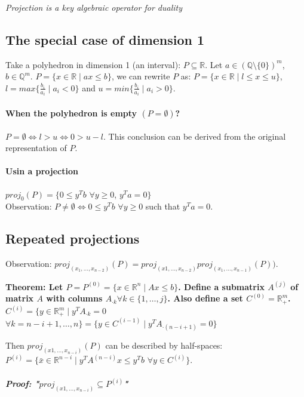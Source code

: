 \documentclass[main]{subfiles}
\begin{document}
\emph{Projection is a key algebraic operator for duality}

\subsection{The special case of dimension 1}
Take a polyhedron in dimension 1 (an interval): $P \subseteq \mathbb{R}$.
Let $a \in (\mathbb{Q}\setminus \{0\})^m$, $b \in \mathbb{Q}^m$. $P = \{ x \in
\mathbb{R} \mid ax \leq b \}$, we can rewrite $P$ as: $P = \{ x \in \mathbb{R}
\mid l \leq x \leq u \}$, $l = max \{ \frac{b_i}{a_i} \mid a_i < 0 \}$ and $u =
min \{ \frac{b_i}{a_i} \mid a_i > 0 \}$.

\paragraph{When the polyhedron is empty $(P = \emptyset)$?}
$P = \emptyset \iff l > u \iff 0 > u-l$. This conclusion can be derived from
the original representation of $P$.

\paragraph{Usin a projection}
$proj_{0}(P) = \{ 0 \leq y^T b$ $\forall y \geq 0$, $y^T a = 0 \}$ \\
Observation: $P \neq \emptyset \iff 0 \leq y^T b$ $\forall y \geq 0$ such that
$y^T a = 0$.

\subsection{Repeated projections}
Observation: $proj_{(x_1, \dots, x_{n-2})}(P) = proj_{(x1, \dots, x_{n-2})}
proj_{(x_1, \dots, x_{n-1})}(P))$.

\textbf{Theorem: Let $P = P^{(0)} = \{ x \in \mathbb{R}^n \mid Ax \leq b \}$.
Define a submatrix $A^{(j)}$ of matrix $A$ with columns $A_{\cdot k} \forall k
\in \{1, \dots, j\}$. Also define a set $C^{(0)} = \mathbb{R}_+^m$. $C^{(i)} =
\{ y \in \mathbb{R}_+^m \mid y^T A_{\cdot k} = 0$ $\forall k = n-i+1, \dots, n
\} = \{y \in C^{(i-1)} \mid y^T A_{\cdot (n-i+1)} = 0\}$ }

Then $proj_{(x1, \dots, x_{n-i})}(P)$ can be described by half-spaces: $P^{(i)}
= \{ \bar{x} \in \mathbb{R}^{n-i} \mid y^T A^{(n-i)}x \leq y^T b$ $\forall y
\in C^{(i)} \}$.

\subparagraph{Proof: "$proj_{(x1, \dots, x_{n-i})} \subseteq P^{(i)}$"}
\end{document}
